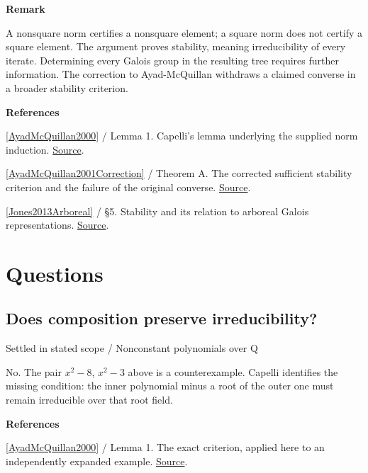 \documentclass[11pt,a4paper,oneside,openany]{book}
\newenvironment{sources}{\par\smallskip\begingroup\footnotesize\color{atlasgray}\leftskip=10pt\setlength{\parskip}{2pt}}{\par\endgroup\smallskip}
\begin{document}
\begin{atlasblock}[boundary]
\textbf{\sffamily Remark}\par\smallskip
\color{black} A nonsquare norm certifies a nonsquare element; a square norm does not certify a square element. The argument proves stability, meaning irreducibility of every iterate. Determining every Galois group in the resulting tree requires further information. The correction to Ayad-McQuillan withdraws a claimed converse in a broader stability criterion.\par
\end{atlasblock}\color{black}
\begin{sources}
\textbf{References}\par\smallskip
\noindent\hyperlink{ref:AyadMcQuillan2000}{[AyadMcQuillan2000]} / Lemma 1. Capelli's lemma underlying the supplied norm induction. \href{https://doi.org/10.4064/aa-93-1-87-97}{Source}.\par
\noindent\hyperlink{ref:AyadMcQuillan2001Correction}{[AyadMcQuillan2001Correction]} / Theorem A. The corrected sufficient stability criterion and the failure of the original converse. \href{https://geodesic.mathdoc.fr/articles/10.4064/aa99-1-9/}{Source}.\par
\noindent\hyperlink{ref:Jones2013Arboreal}{[Jones2013Arboreal]} / §5. Stability and its relation to arboreal Galois representations. \href{https://www.numdam.org/articles/10.5802/pmb.a-154/}{Source}.\par
\end{sources}\color{black}
\section*{Questions}
\subsection*{Does composition preserve irreducibility?}
{\small\sffamily\color{atlasgold}Settled in stated scope / Nonconstant polynomials over Q}\par\smallskip
\color{black} No. The pair \(x^2-8\), \(x^2-3\) above is a counterexample. Capelli identifies the missing condition: the inner polynomial minus a root of the outer one must remain irreducible over that root field.\par
\begin{sources}
\textbf{References}\par\smallskip
\noindent\hyperlink{ref:AyadMcQuillan2000}{[AyadMcQuillan2000]} / Lemma 1. The exact criterion, applied here to an independently expanded example. \href{https://doi.org/10.4064/aa-93-1-87-97}{Source}.\par
\end{sources}\color{black}
\end{document}

